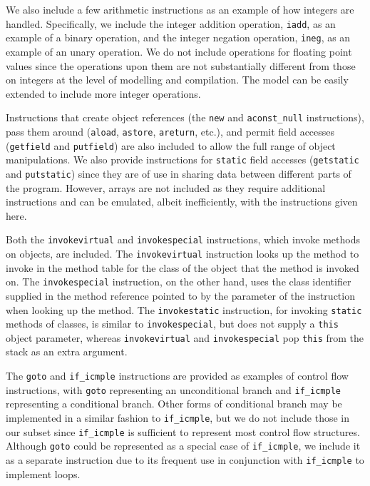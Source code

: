 We also include a few arithmetic instructions as an example of how
integers are handled.
Specifically, we include the integer addition operation,
\texttt{iadd}, as an example of a binary operation, and the integer
negation operation, \texttt{ineg}, as an example of an unary
operation.
We do not include operations for floating point values since the
operations upon them are not substantially different from those on
integers at the level of modelling and compilation.
The model can be easily extended to include more integer operations.

Instructions that create object references (the \texttt{new} and
\texttt{aconst\_null} instructions), pass them around (\texttt{aload},
\texttt{astore}, \texttt{areturn}, etc.), and permit
field accesses (\texttt{getfield} and \texttt{putfield}) are also
included to allow the full range of object manipulations.
We also provide instructions for \texttt{static} field accesses
(\texttt{getstatic} and \texttt{putstatic}) since they are of use in
sharing data between different parts of the program.
However, arrays are not included as they require additional
instructions and can be emulated, albeit inefficiently, with the
instructions given here.

Both the \texttt{invokevirtual} and \texttt{invokespecial}
instructions, which invoke methods on objects, are included.
The \texttt{invokevirtual} instruction looks up the method to invoke
in the method table for the class of the object that the method is
invoked on.
The \texttt{invokespecial} instruction, on the other hand, uses the
class identifier supplied in the method reference pointed to by the
parameter of the instruction when looking up the method.
The \texttt{invokestatic} instruction, for invoking \texttt{static}
methods of classes, is similar to \texttt{invokespecial}, but does not
supply a \texttt{this} object parameter, whereas
\texttt{invokevirtual} and \texttt{invokespecial} pop \texttt{this}
from the stack as an extra argument.

The \texttt{goto} and \texttt{if\_icmple} instructions are provided as
examples of control flow instructions, with \texttt{goto} representing
an unconditional branch and \texttt{if\_icmple} representing a
conditional branch.
Other forms of conditional branch may be implemented in a similar
fashion to \texttt{if\_icmple}, but we do not include those in our
subset since \texttt{if\_icmple} is sufficient to represent most
control flow structures.
Although \texttt{goto} could be represented as a special case of
\texttt{if\_icmple}, we include it as a separate instruction due to
its frequent use in conjunction with \texttt{if\_icmple} to implement
loops.

